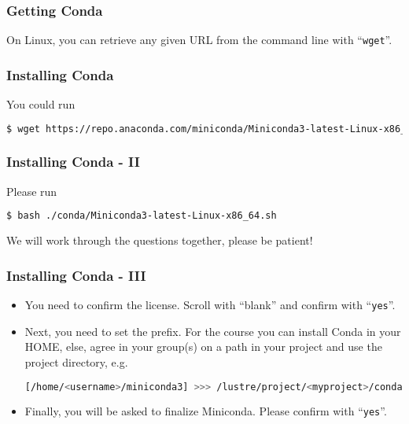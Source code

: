 \begin{frame}[fragile]
  \frametitle{Getting Conda}
  On Linux, you can retrieve any given URL from the command line with ``\texttt{wget}''. 
  \pause
\end{frame}

\begin{frame}[fragile]
  \frametitle{Installing Conda}
  You could run
  \begin{lstlisting}[language=Bash, style=Shell, basicstyle=\small,breaklines=true ]
$ wget https://repo.anaconda.com/miniconda/Miniconda3-latest-Linux-x86_64.sh
  \end{lstlisting}
  \pause
 \end{frame} 
 
\begin{frame}[fragile]
  \frametitle{Installing Conda - II}
  Please run
  \begin{lstlisting}[language=Bash, style=Shell]
$ bash ./conda/Miniconda3-latest-Linux-x86_64.sh
  \end{lstlisting}
  We will work through the questions together, please be patient!
\end{frame}

\begin{frame}[fragile]
  \frametitle{Installing Conda - III}
  \begin{itemize}[<+->]
   \item You need to confirm the license. Scroll with ``blank'' and confirm with ``\verb+yes+''.
   \item Next, you need to set the prefix. For the course you can install Conda in your HOME, else, agree in your group(s) on a path in your project and use the project directory, e.g. 
   \begin{lstlisting}[language=Bash, style=Shell, breaklines=true ]
[/home/<username>/miniconda3] >>> /lustre/project/<myproject>/conda
   \end{lstlisting}
   \item Finally, you will be asked to finalize Miniconda. Please confirm with ``\verb+yes+''.
  \end{itemize}
\end{frame}

